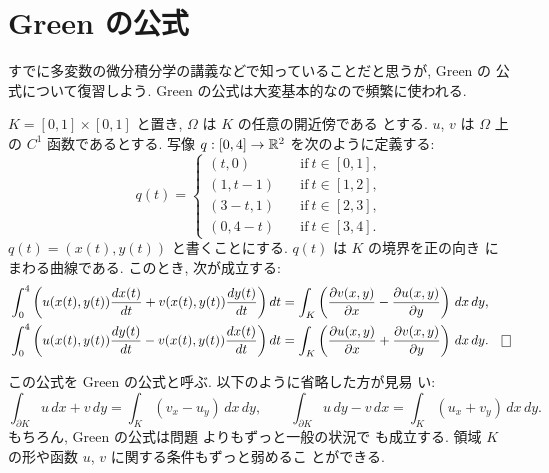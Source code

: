 \documentclass[12pt,twoside]{jarticle}
\def\R{{\Bbb R}} %
\def\del{\partial}  %
\begin{document}

\section{Green の公式}

すでに多変数の微分積分学の講義などで知っていることだと思うが, Green の
公式について復習しよう. Green の公式は大変基本的なので頻繁に使われる.

\begin{question}\label{q:Green1}
  $K=[0,1] \times [0,1]$ と置き, $\Omega$ は $K$ の任意の開近傍である
  とする. $u$, $v$ は $\Omega$ 上の $C^1$ 函数であるとする. 写像 
  $q:[0,4]\to\R^2$ を次のように定義する:
  \[
    q(t)=
    \begin{cases}
      (t,0)   \quad & \text{if}\ t\in [0,1], \\
      (1,t-1) \quad & \text{if}\ t\in [1,2], \\
      (3-t,1) \quad & \text{if}\ t\in [2,3], \\
      (0,4-t) \quad & \text{if}\ t\in [3,4].
    \end{cases}
  \]%
  $q(t)=(x(t),y(t))$ と書くことにする.  $q(t)$ は $K$ の境界を正の向き
  にまわる曲線である. このとき, 次が成立する:
  \begin{align*}
    &
    \int_0^4 
    \left( 
      u(x(t),y(t)) \frac{dx(t)}{dt} + v(x(t),y(t)) \frac{dy(t)}{dt}
    \right)
    dt
    =
    \int_K
    \left(
      \frac{\del v(x,y)}{\del x} - \frac{\del u(x,y)}{\del y} 
    \right)
    \,dx\,dy,
    \\
    &
    \int_0^4 
    \left( 
      u(x(t),y(t)) \frac{dy(t)}{dt} - v(x(t),y(t)) \frac{dx(t)}{dt}
    \right)
    dt
    =
    \int_K
    \left(
      \frac{\del u(x,y)}{\del x} + \frac{\del v(x,y)}{\del y} 
    \right)
    \,dx\,dy.  \qed
  \end{align*}
\end{question}

\noindent この公式を Green の公式と呼ぶ. 以下のように省略した方が見易
い:
\[
  \int_{\del K} u \,dx + v \,dy
  =
  \int_K (v_x - u_y)\,dx\,dy,
  \qquad
  \int_{\del K} u \,dy - v \,dx
  =
  \int_K (u_x + v_y)\,dx\,dy.
\]%
もちろん, Green の公式は問題  よりもずっと一般の状況で
も成立する. 領域 $K$ の形や函数 $u$, $v$ に関する条件もずっと弱めるこ
とができる. 
\end{document}

